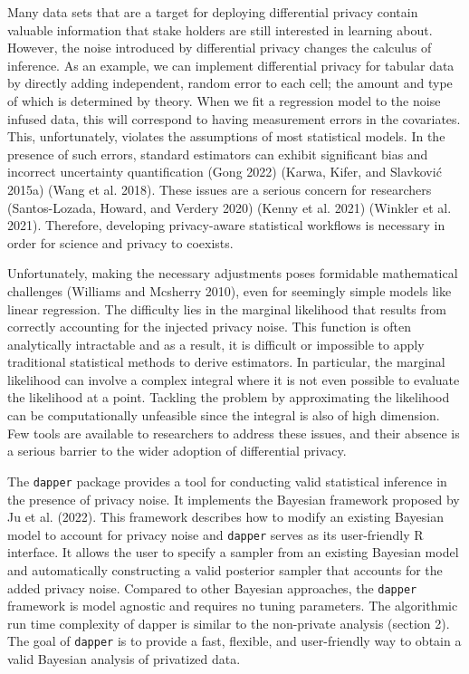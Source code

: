 Many data sets that are a target for deploying differential privacy contain
valuable information that stake holders are still interested in
learning about. However, the noise introduced by differential privacy
changes the calculus of inference. As an example,
we can implement differential privacy for tabular data by directly
adding independent, random error to each cell; the amount and type of which is determined by theory. When we fit a regression model to the noise infused data,
this will correspond to having measurement errors
in the covariates. This, unfortunately, violates the assumptions of most statistical models.
In the presence of such errors, standard estimators can exhibit significant bias and incorrect uncertainty quantification
(Gong 2022) (Karwa, Kifer, and Slavković 2015a) (Wang et al. 2018).
These issues are a serious concern for researchers (Santos-Lozada, Howard, and Verdery 2020) (Kenny et al. 2021) (Winkler et al. 2021).
Therefore, developing privacy-aware statistical workflows is necessary in order
for science and privacy to coexists.

Unfortunately, making the necessary adjustments poses formidable mathematical
challenges (Williams and Mcsherry 2010), even for seemingly simple models like linear regression.
The difficulty lies in the marginal likelihood that results from correctly accounting for the injected
privacy noise. This function is often analytically intractable and as a result,
it is difficult or impossible to apply traditional statistical methods
to derive estimators. In particular, the marginal likelihood can involve a complex
integral where it is not even possible to evaluate the likelihood
at a point. Tackling the problem by approximating the likelihood can be computationally
unfeasible since the integral is also of high dimension.
Few tools are available to researchers to address these issues,
and their absence is a serious barrier to the wider adoption
of differential privacy.

The \texttt{dapper} package provides a tool for conducting
valid statistical inference in the presence of privacy noise.
It implements the Bayesian framework proposed by Ju et al. (2022). This framework describes how to modify
an existing Bayesian model to account for privacy noise and \texttt{dapper}
serves as its user-friendly R interface. It allows the
user to specify a sampler from an existing Bayesian model and
automatically constructing a valid posterior sampler that accounts for the
added privacy noise. Compared to other Bayesian approaches, the \texttt{dapper} framework
is model agnostic and requires no tuning parameters. The algorithmic run time
complexity of dapper is similar to the non-private analysis (section 2). The goal of \texttt{dapper} is to provide
a fast, flexible, and user-friendly way to obtain a valid Bayesian analysis of privatized data.

